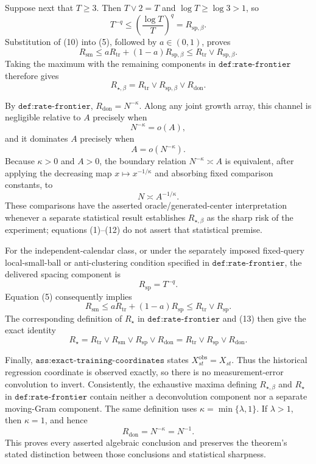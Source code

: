 Suppose next that \(T\geq3\).  Then \(T\vee2=T\) and \(\log T\geq\log3>1\), so
\[
T^{-q}
\leq\left(\frac{\log T}{T}\right)^q
=R_{\mathrm{sp},\beta}.
\tag{10}
\]
Substitution of (10) into (5), followed by \(a\in(0,1)\), proves
\[
R_{\mathrm{sm}}
\leq aR_{\mathrm{tr}}+(1-a)R_{\mathrm{sp},\beta}
\leq R_{\mathrm{tr}}\vee R_{\mathrm{sp},\beta}.
\tag{11}
\]
Taking the maximum with the remaining components in \(\texttt{def:rate-frontier}\) therefore gives
\[
R_{\star,\beta}
=R_{\mathrm{tr}}\vee R_{\mathrm{sp},\beta}\vee R_{\mathrm{don}}.
\tag{12}
\]

By \(\texttt{def:rate-frontier}\), \(R_{\mathrm{don}}=N^{-\kappa}\).  Along any joint growth array, this channel is negligible relative to \(A\) precisely when
\[
N^{-\kappa}=o(A),
\]
and it dominates \(A\) precisely when
\[
A=o(N^{-\kappa}).
\]
Because \(\kappa>0\) and \(A>0\), the boundary relation \(N^{-\kappa}\asymp A\) is equivalent, after applying the decreasing map \(x\mapsto x^{-1/\kappa}\) and absorbing fixed comparison constants, to
\[
N\asymp A^{-1/\kappa}.
\]
These comparisons have the asserted oracle/generated-center interpretation whenever a separate statistical result establishes \(R_{\star,\beta}\) as the sharp risk of the experiment; equations (1)--(12) do not assert that statistical premise.

For the independent-calendar class, or under the separately imposed fixed-query local-small-ball or anti-clustering condition specified in \(\texttt{def:rate-frontier}\), the delivered spacing component is
\[
R_{\mathrm{sp}}=T^{-q}.
\]
Equation (5) consequently implies
\[
R_{\mathrm{sm}}
\leq aR_{\mathrm{tr}}+(1-a)R_{\mathrm{sp}}
\leq R_{\mathrm{tr}}\vee R_{\mathrm{sp}}.
\tag{13}
\]
The corresponding definition of \(R_\star\) in \(\texttt{def:rate-frontier}\) and (13) then give the exact identity
\[
R_\star
=R_{\mathrm{tr}}\vee R_{\mathrm{sm}}\vee R_{\mathrm{sp}}\vee R_{\mathrm{don}}
=R_{\mathrm{tr}}\vee R_{\mathrm{sp}}\vee R_{\mathrm{don}}.
\]

Finally, \(\texttt{ass:exact-training-coordinates}\) states \(X_{st}^{\mathrm{obs}}=X_{st}\).  Thus the historical regression coordinate is observed exactly, so there is no measurement-error convolution to invert.  Consistently, the exhaustive maxima defining \(R_{\star,\beta}\) and \(R_\star\) in \(\texttt{def:rate-frontier}\) contain neither a deconvolution component nor a separate moving-Gram component.  The same definition uses \(\kappa=\min\{\lambda,1\}\).  If \(\lambda>1\), then \(\kappa=1\), and hence
\[
R_{\mathrm{don}}=N^{-\kappa}=N^{-1}.
\]
This proves every asserted algebraic conclusion and preserves the theorem's stated distinction between those conclusions and statistical sharpness.

